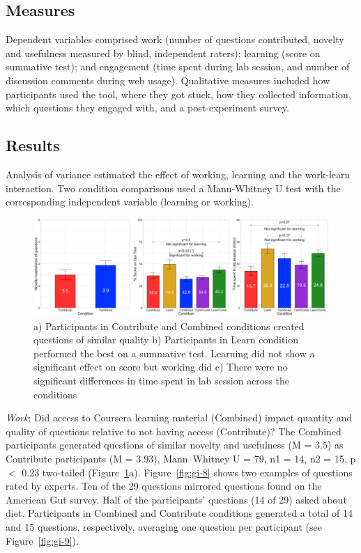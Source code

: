 \subsection*{Measures}
Dependent variables comprised work (number of questions contributed, novelty and usefulness measured by blind, independent raters); learning (score on summative test); and engagement (time spent during lab session, and number of discussion comments during web usage). Qualitative measures included how participants used the tool, where they got stuck, how they collected information, which questions they engaged with, and a post-experiment survey.

\subsection*{Results}
Analysis of variance estimated the effect of working, learning and the work-learn interaction. Two condition comparisons used a Mann-Whitney U test with the corresponding independent variable (learning or working). 

\begin{figure}[h] 
  \centering
  \includegraphics[width=1.0\textwidth]{figures/gutinstinct/gi-7.png}
  \caption[Results: Question quality, Learning Score, and Time Spent]
{a) Participants in Contribute and Combined conditions created questions of similar quality b) Participants in Learn condition performed the best on a summative test. Learning did not show a significant effect on score but working did c) There were no significant differences in time spent in lab session across the conditions }
  \label{fig:gi-7}
\end{figure}

\textit{Work}: Did access to Coursera learning material (Combined) impact quantity and quality of questions relative to not having access (Contribute)? The Combined participants generated questions of similar novelty and usefulness (M = 3.5) as Contribute participants (M = 3.93), Mann–Whitney U = 79, n1 = 14, n2 = 15, p $<$ 0.23 two-tailed (Figure~\ref{fig:gi-7}a). Figure~\ref{fig:gi-8} shows two examples of questions rated by experts. Ten of the 29 questions mirrored questions found on the American Gut survey. Half of the participants’ questions (14 of 29) asked about diet. Participants in Combined and Contribute conditions generated a total of 14 and 15 questions, respectively, averaging one question per participant (see Figure~\ref{fig:gi-9}). 

